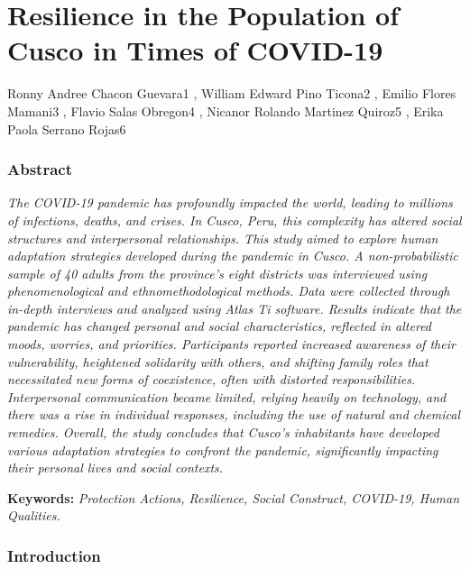 \documentclass{article}
\begin{document}
\section{\textbf{Resilience in the Population of Cusco in Times of COVID-19}}

Ronny Andree Chacon Guevara1 , William Edward Pino Ticona2 , Emilio Flores Mamani3 , Flavio Salas Obregon4 , Nicanor Rolando Martinez Quiroz5 , Erika Paola Serrano Rojas6

\subsubsection{\textbf{Abstract}}

\textit{The COVID-19 pandemic has profoundly impacted the world, leading to millions of infections, deaths, and crises. In Cusco, Peru, this complexity has altered social structures and interpersonal relationships. This study aimed to explore human adaptation strategies developed during the pandemic in Cusco. A non-probabilistic sample of 40 adults from the province's eight districts was interviewed using phenomenological and ethnomethodological methods. Data were collected through in-depth interviews and analyzed using Atlas Ti software. Results indicate that the pandemic has changed personal and social characteristics, reflected in altered moods, worries, and priorities. Participants reported increased awareness of their vulnerability, heightened solidarity with others, and shifting family roles that necessitated new forms of coexistence, often with distorted responsibilities. Interpersonal communication became limited, relying heavily on technology, and there was a rise in individual responses, including the use of natural and chemical remedies. Overall, the study concludes that Cusco's inhabitants have developed various adaptation strategies to confront the pandemic, significantly impacting their personal lives and social contexts.}

\textbf{Keywords:} \textit{Protection Actions, Resilience, Social Construct, COVID-19, Human Qualities.}

\subsubsection{\textbf{Introduction}}
\end{document}
